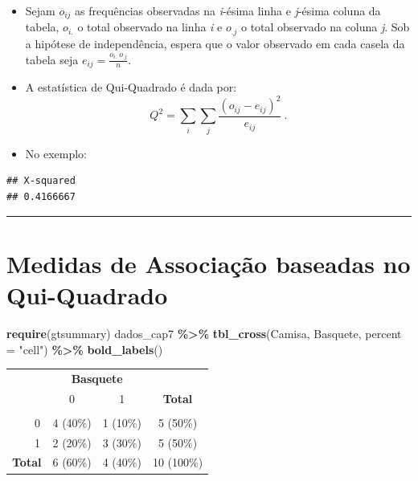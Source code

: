 \documentclass[
]{book}
\newenvironment{Shaded}{\begin{snugshade}}{\end{snugshade}}
\newcommand{\AttributeTok}[1]{\textcolor[rgb]{0.13,0.29,0.53}{#1}}
\newcommand{\FunctionTok}[1]{\textcolor[rgb]{0.13,0.29,0.53}{\textbf{#1}}}
\newcommand{\NormalTok}[1]{#1}
\newcommand{\OtherTok}[1]{\textcolor[rgb]{0.56,0.35,0.01}{#1}}
\newcommand{\SpecialCharTok}[1]{\textcolor[rgb]{0.81,0.36,0.00}{\textbf{#1}}}
\newcommand{\StringTok}[1]{\textcolor[rgb]{0.31,0.60,0.02}{#1}}
\begin{document}
\begin{itemize}
\item
  Sejam \(o_{ij}\) as frequências observadas na \emph{i}-ésima linha e \emph{j}-ésima coluna da tabela, \(o_{i.}\) o total observado na linha \emph{i} e \(o_{.j}\) o total observado na coluna \emph{j}. Sob a hipótese de independência, espera que o valor observado em cada casela da tabela seja \(\displaystyle e_{ij} = \frac{o_{i.}~o_{.j}}{n}\).
\item
  A estatística de Qui-Quadrado é dada por:
  \[Q^2 = \sum_i \sum_j \frac{(o_{ij}-e_{ij})^2}{e_{ij}}~.\]
\item
  No exemplo:
\end{itemize}

\begin{Shaded}
\end{Shaded}

\begin{verbatim}
## X-squared 
## 0.4166667
\end{verbatim}

\begin{center}\rule{0.5\linewidth}{0.5pt}\end{center}

\section{Medidas de Associação baseadas no Qui-Quadrado}\label{medidas-de-associauxe7uxe3o-baseadas-no-qui-quadrado}

\begin{Shaded}
\begin{Highlighting}[]
\FunctionTok{require}\NormalTok{(gtsummary)}
\NormalTok{dados\_cap7 }\SpecialCharTok{\%\textgreater{}\%} \FunctionTok{tbl\_cross}\NormalTok{(Camisa, Basquete, }\AttributeTok{percent =} \StringTok{"cell"}\NormalTok{) }\SpecialCharTok{\%\textgreater{}\%}
  \FunctionTok{bold\_labels}\NormalTok{()}
\end{Highlighting}
\end{Shaded}

\begin{table}[t]
\fontsize{12.0pt}{14.4pt}\selectfont
\begin{tabular*}{\linewidth}{@{\extracolsep{\fill}}lccc}
\toprule
 & \multicolumn{2}{c}{\textbf{Basquete}} &  \\ 
\cmidrule(lr){2-3}
 & 0 & 1 & \textbf{Total} \\ 
\midrule\addlinespace[2.5pt]
{\bfseries Camisa} &  &  &  \\ 
    0 & 4 (40\%) & 1 (10\%) & 5 (50\%) \\ 
    1 & 2 (20\%) & 3 (30\%) & 5 (50\%) \\ 
{\bfseries Total} & 6 (60\%) & 4 (40\%) & 10 (100\%) \\ 
\bottomrule
\end{tabular*}
\end{table}
\end{document}
